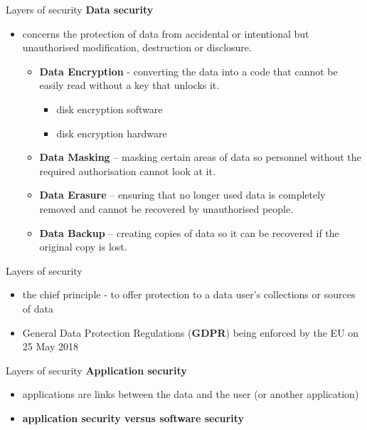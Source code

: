 \documentclass[pdf]{beamer}
\begin{document}
\begin{frame}{Layers of security}
\textbf{Data security}
\begin{itemize}
\item
concerns the protection of data from accidental or intentional but unauthorised modification, destruction or disclosure.

\begin{itemize}
\item
\textbf{Data Encryption} - converting the data into a code that cannot be easily read without a key that unlocks it.
\begin{itemize}
\item
disk encryption software
\item
disk encryption hardware
\end{itemize}
\item
\textbf{Data Masking} – masking certain areas of data so personnel without the required authorisation cannot look at it.
\item
\textbf{Data Erasure} – ensuring that no longer used data is completely removed and cannot be recovered by unauthorised people.
\item
\textbf{Data Backup} – creating copies of data so it can be recovered if the original copy is lost.
\end{itemize}
\end{itemize}
\end{frame}



\begin{frame}{Layers of security}
\begin{itemize}
\item
the chief principle - to offer protection to a data user’s collections or sources of data
\item
General Data Protection Regulations (\textbf{GDPR}) being enforced by the EU on 25 May 2018
\end{itemize}
\end{frame}



\begin{frame}{Layers of security}
\textbf{Application security}
\begin{itemize}
\item
applications are links between the data and the user (or another application)
\item
\textbf{application security versus software security}

\end{itemize}
\end{frame}
\end{document}

